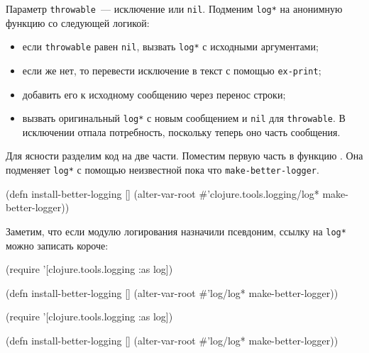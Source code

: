 \fi

Параметр \verb|throwable|~--- исключение или \verb|nil|. Подменим \verb|log*| на
анонимную функцию со следующей логикой:

\begin{itemize}

\item
  если \verb|throwable| равен \verb|nil|, вызвать \verb|log*| с исходными
  аргументами;

\item
  если же нет, то перевести исключение в текст с помощью \verb|ex-print|;

\item
  добавить его к исходному сообщению через перенос строки;

\item
  вызвать оригинальный \verb|log*| с новым сообщением и \verb|nil| для
  \verb|throwable|. В исключении отпала потребность, поскольку теперь оно
  часть сообщения.

\end{itemize}

Для ясности разделим код на две части. Поместим первую часть в функцию
. Она подменяет \verb|log*| с помощью неизвестной
пока что \texttt{make-better-logger}.

\begin{english}
  \begin{clojure}
(defn install-better-logging []
  (alter-var-root
   #'clojure.tools.logging/log*
   make-better-logger))
  \end{clojure}
\end{english}

Заметим, что если модулю логирования назначили псевдоним, ссылку на \verb|log*|
можно записать короче:


\ifnarrow

\begin{english}
  \begin{clojure}
(require '[clojure.tools.logging :as log])

(defn install-better-logging []
  (alter-var-root
    #'log/log* make-better-logger))
  \end{clojure}
\end{english}

\else

\begin{english}
  \begin{clojure}
(require '[clojure.tools.logging :as log])

(defn install-better-logging []
  (alter-var-root #'log/log* make-better-logger))
  \end{clojure}
\end{english}

